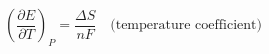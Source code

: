 \documentclass[preview]{standalone}
\begin{document}
\[\left(\frac{\partial E}{\partial T}\right)_P = \frac{\Delta S}{nF} \quad \text{(temperature coefficient)}\]
\end{document}
